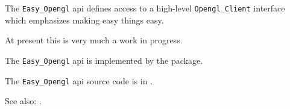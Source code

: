 
The {\tt Easy\_Opengl} api defines access to a high-level {\tt Opengl\_Client} interface 
which emphasizes making easy things easy.

At present this is very much a work in progress.

The {\tt Easy\_Opengl} api is implemented by the  package.

The {\tt Easy\_Opengl} api source code is in .

See also:  .



